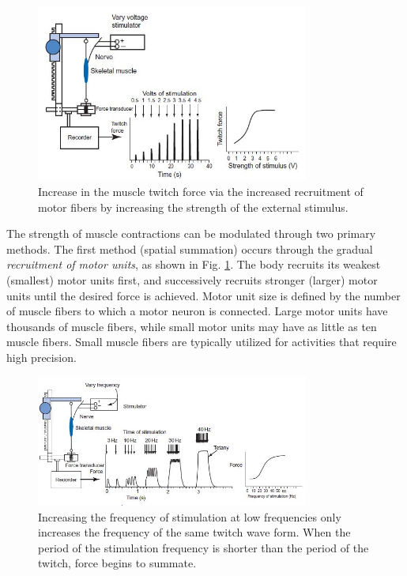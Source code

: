 \documentclass{article}
\begin{document}
\begin{figure}[h]
\includegraphics[width=0.8\textwidth]{../images/EMG_I_2.jpg}
\centering
\caption{Increase in the muscle twitch force via the increased recruitment of motor fibers by increasing the strength of the external stimulus.}
\label{force}
\end{figure}

The strength of muscle contractions can be modulated through two primary methods. The first method (spatial summation) occurs through the gradual \textit{recruitment of motor units}, as shown in Fig. \ref{force}. The body recruits its weakest (smallest) motor units first, and successively recruits stronger (larger) motor units until the desired force is achieved. Motor unit size is defined by the number of muscle fibers to which a motor neuron is connected. Large motor units have thousands of muscle fibers, while small motor units may have as little as ten muscle fibers. Small muscle fibers are typically utilized for activities that require high precision.

\begin{figure}[h]
\includegraphics[width=0.8\textwidth]{../images/EMG_I_3.jpg}
\centering
\caption{Increasing the frequency of stimulation at low frequencies only increases the frequency of the same twitch wave form. When the period of the stimulation frequency is shorter than the period of the twitch, force begins to summate.}
\label{freq}
\end{figure}
\end{document}
